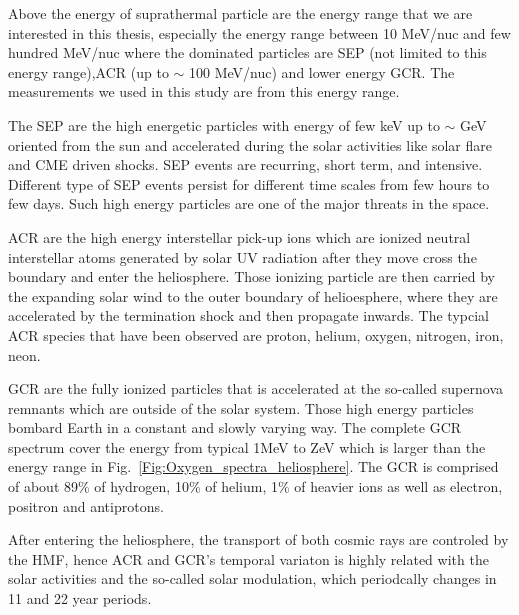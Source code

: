 Above the energy of suprathermal particle are the energy range that we are interested in this thesis, especially the energy range between 10 MeV/nuc and few hundred MeV/nuc where the dominated particles are \ac{SEP} (not limited to this energy range),\ac{ACR} (up to $\sim$ 100 MeV/nuc) and lower energy \ac{GCR}. The measurements we used in this study are from this energy range.

The \ac{SEP} are the high energetic particles with energy of few keV up to $\sim$ GeV oriented from the sun and accelerated during the solar activities like solar flare and \ac{CME} driven shocks. \acs{SEP} events are recurring, short term, and intensive. Different type of \acs{SEP} events persist for different time scales from few hours to few days. Such high energy particles are one of the major threats in the space.

\acs{ACR} are the high energy interstellar pick-up ions \citep{Giacalone2022SSRv} which are ionized neutral interstellar atoms generated by solar UV radiation after they move cross the boundary and enter the heliosphere. Those ionizing particle are then carried by the expanding solar wind to the outer boundary of helioesphere, where they are accelerated by the termination shock and then propagate inwards. The typcial \ac{ACR} species that have been observed are proton, helium, oxygen, nitrogen, iron, neon. 

\ac{GCR} are the fully ionized particles that is accelerated at the so-called supernova remnants \citep{Blasi2013AARv2013} which are outside of the solar system. Those high energy particles bombard Earth in a constant and slowly varying way. The complete GCR spectrum cover the energy from typical 1MeV \citep{Potgieter2013LRSP} to ZeV which is larger than the energy range in Fig.~\ref{Fig:Oxygen_spectra_heliosphere}. The \acs{GCR} is comprised of about 89\% of hydrogen, 10\% of helium, 1\% of heavier ions as well as electron, positron and antiprotons. 

After entering the heliosphere, the transport of both cosmic rays are controled by the \ac{HMF}, hence \ac{ACR} and \ac{GCR}'s temporal variaton is highly related with the solar activities and the so-called solar modulation, which periodcally changes in 11 and 22 year periods. 


